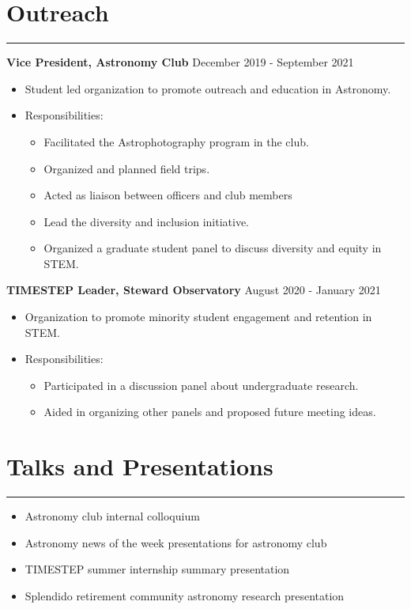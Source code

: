 \documentclass[11pt]{article}
\newcommand{\resumesection}[1]{\vspace{-0.2cm}\section*{#1}\vspace{-0.2cm}\hrule\vspace{0.2cm}}
\begin{document}
\resumesection{Outreach}
\textbf{Vice President, Astronomy Club} \hfill December 2019 - September 2021
\begin{itemize}
	\item Student led organization to promote outreach and education in Astronomy. 
	\item Responsibilities: 
	\begin{itemize}
		\item Facilitated the Astrophotography program in the club.
		\item Organized and planned field trips.
		\item Acted as liaison between officers and club members
		\item Lead the diversity and inclusion initiative.
		\item Organized a graduate student panel to discuss diversity and equity in STEM.
	\end{itemize}	       
\end{itemize} 
\textbf{TIMESTEP Leader, Steward Observatory} \hfill August 2020 - January 2021
\begin{itemize}
	\item Organization to promote minority student engagement and retention in STEM. 
	\item Responsibilities: 
	\begin{itemize}
		\item Participated in a discussion panel about undergraduate research. 
		\item Aided in organizing other panels and proposed future meeting ideas. 
	\end{itemize}    
\end{itemize} 

\resumesection{Talks and Presentations}
\begin{itemize}
	\item Astronomy club internal colloquium 
	\item Astronomy news of the week presentations for astronomy club 
	\item TIMESTEP summer internship summary presentation
	\item Splendido retirement community astronomy research presentation
\end{itemize}
\end{document}
